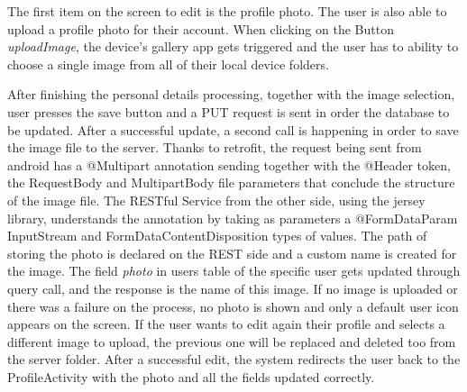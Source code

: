 \documentclass[12pt]{article}
\begin{document}
	The first item on the screen to edit is the profile photo. The user is also able to upload a profile photo for their account. When clicking on the Button \textit{uploadImage}, the device's gallery app gets triggered and the user has to ability to choose a single image from all of their local device folders. 
	
	After finishing the personal details processing, together with the image selection, user presses the save button and a PUT request is sent in order the database to be updated. After a successful update, a second call is happening in order to save the image file to the server. Thanks to retrofit, the request being sent from android has a @Multipart annotation sending together with the @Header token, the RequestBody and MultipartBody file parameters that conclude the structure of the image file. The RESTful Service from the other side, using the jersey library, understands the annotation by taking as parameters a @FormDataParam InputStream and FormDataContentDisposition types of values. The path of storing the photo is declared on the REST side and a custom name is created for the image. The field \textit{photo} in users table of the specific user gets updated through query call, and the response is the name of this image. If no image is uploaded or there was a failure on the process, no photo is shown and only a default user icon appears on the screen. If the user wants to edit again their profile and selects a different image to upload, the previous one will be replaced and deleted too from the server folder. After a successful edit, the system redirects the user back to the ProfileActivity with the photo and all the fields updated correctly.
	
\end{document}
